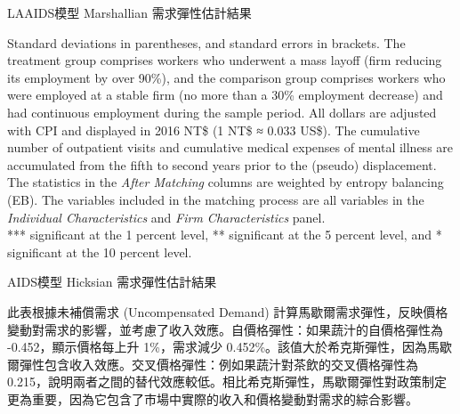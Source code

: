 \begin{table}[H]
    \caption{LAAIDS模型 Marshallian 需求彈性估計結果}
    \center
      \label{laaids_marshall}
\end{table}
\vspace{-2em}
\begin{singlespace}
    \begin{footnotesize}
     Standard deviations in parentheses, and standard errors in brackets. The treatment group comprises workers who underwent a mass layoff (firm reducing its employment by over 90\%), and the comparison group comprises workers who were employed at a stable firm (no more than a 30\% employment decrease) and had continuous employment during the sample period. All dollars are adjusted with CPI and displayed in 2016 NT\$ (1 NT\$ ≈ 0.033 US\$). The cumulative number of outpatient visits and cumulative medical expenses of mental illness are accumulated from the fifth to second years prior to the (pseudo) displacement. The statistics in the {\it After Matching} columns are weighted by entropy balancing (EB). The variables included in the matching process are all variables in the {\it Individual Characteristics} and {\it Firm Characteristics} panel. \\
    *** significant at the 1 percent level, ** significant at the 5 percent level, and * significant at the 10 percent level.
    \end{footnotesize}
\end{singlespace}

\begin{table}[H]
    \caption{AIDS模型 Hicksian 需求彈性估計結果}
    \center
    
\end{table}
\vspace{-2em}
\begin{singlespace}
    \begin{footnotesize}
        \raggedright
         此表根據未補償需求 (Uncompensated Demand) 計算馬歇爾需求彈性，反映價格變動對需求的影響，並考慮了收入效應。自價格彈性：如果蔬汁的自價格彈性為 -0.452，顯示價格每上升 1\%，需求減少 0.452\%。該值大於希克斯彈性，因為馬歇爾彈性包含收入效應。交叉價格彈性：例如果蔬汁對茶飲的交叉價格彈性為 0.215，說明兩者之間的替代效應較低。相比希克斯彈性，馬歇爾彈性對政策制定更為重要，因為它包含了市場中實際的收入和價格變動對需求的綜合影響。
    \end{footnotesize}
\end{singlespace}

